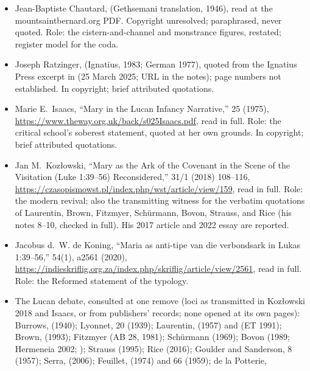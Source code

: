 \begin{itemize}
Scheeben's own Christological policing.
\item Jean-Baptiste Chautard, 
(Gethsemani translation, 1946), read at the mountsaintbernard.org PDF.
Copyright unresolved; paraphrased, never quoted. Role: the
cistern-and-channel and monstrance figures, restated; register model
for the coda.
\item Joseph Ratzinger,  (Ignatius, 1983; German
1977), quoted from the Ignatius Press excerpt in  (25 March 2025; URL in the notes); page numbers not
established. In copyright; brief attributed quotations.
\item Marie E.~Isaacs, ``Mary in the Lucan Infancy Narrative,''
 25 (1975),
\url{https://www.theway.org.uk/back/s025Isaacs.pdf}, read in full.
Role: the critical school's soberest statement, quoted at her own
grounds. In copyright; brief attributed quotations.
\item Jan M.~Koz{\l}owski, ``Mary as the Ark of the Covenant in the
Scene of the Visitation (Luke 1:39--56) Reconsidered,''
 31/1 (2018) 108--116,
\url{https://czasopismowst.pl/index.php/wst/article/view/159}, read in
full. Role: the modern revival; also the transmitting witness for the
verbatim quotations of Laurentin, Brown, Fitzmyer, Sch\"urmann, Bovon,
Strauss, and Rice (his notes 8--10, checked in full). His 2017
 article and 2022  essay are reported.
\item Jacobus d.~W. de Koning, ``Maria as anti-tipe van die
verbondsark in Lukas 1:39--56,''  54(1), a2561
(2020),
\url{https://indieskriflig.org.za/index.php/skriflig/article/view/2561},
read in full. Role: the Reformed statement of the typology.
\item The Lucan debate, consulted at one remove (loci as transmitted
in Koz{\l}owski 2018 and Isaacs, or from publishers' records; none
opened at its own pages): Burrows, 
(1940); Lyonnet,  20 (1939); Laurentin,  (1957) and  (ET 1991); Brown,  (1993);
Fitzmyer (AB 28, 1981); Sch\"urmann (1969); Bovon (1989; Hermeneia
2002; ); Strauss (1995); Rice (2016);
Goulder and Sanderson,  8 (1957); Serra,  (2006); Feuillet,  (1974)
and  66 (1959); de la Potterie, 
\end{itemize}
